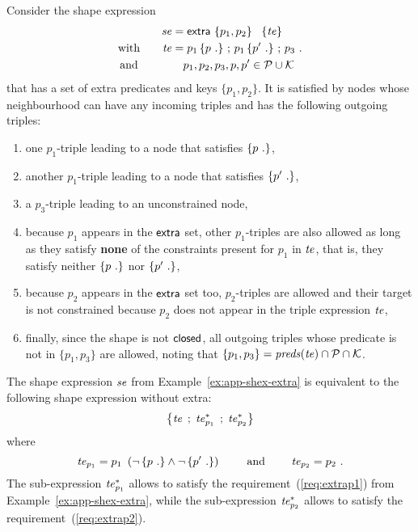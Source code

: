 \begin{example}
\label{ex:app-shex-extra}
Consider the \stshex shape expression
\begin{align*}
  \stse
& =
  \stextra\ \{p_1, p_2\}\ \ \shexneigh{\stte}
\\
  \text{with} \qquad \stte
& =
  p_1 \shexneigh{p\ .} \,\shexeach\, p_1 \shexneigh{p'\ .} \,\shexeach\, p_3\ .
\\ %
  \text{and}\qquad \quad
&
  \quad p_1, p_2, p_3, p, p' \in \Predicates \cup \Keys
\end{align*}
that has a set of extra predicates and keys $\{ p_1, p_2 \}$.
It is satisfied by nodes whose neighbourhood can have any incoming triples and
has the following outgoing triples:
\begin{enumerate}
\item
  one $p_1$-triple leading to a node that satisfies $\left\{ p\ . \right\}$,
\item
  another $p_1$-triple leading to a node that satisfies $\left\{ p'\ . \right\}$,
\item
  a $p_3$-triple leading to an unconstrained node,
\item
  \label{req:extrap1}
  because $p_1$ appears in the $\mathsf{extra}$ set, other $p_1$-triples are also
  allowed as long as they satisfy \textbf{none} of the constraints present for
  $p_1$ in $\mathit{te}$, that is, they satisfy neither $\left\{ p\ . \right\}$ nor
  $\left\{ p'\ . \right\}$,
\item
  \label{req:extrap2}
  because $p_2$ appears in the $\mathsf{extra}$ set too, $p_2$-triples are allowed and
  their target is not constrained because $p_2$ does not appear in the triple
  expression $\mathit{te}$,
\item
  \label{req:closed}
  finally, since the shape is not $\mathsf{closed}$, all outgoing triples whose
  predicate is not in $\{ p_1, p_3 \}$ are allowed, noting that $\{ p_1, p_3 \} =
  \mathit{preds}(\mathit{te}) \cap \mathcal{P} \cap \mathcal{K}$.
\end{enumerate}
\end{example}
The shape expression $\mathit{se}$ from Example~\ref{ex:app-shex-extra} is equivalent
to the following shape expression without extra:
\[
  \left\{  \mathit{te} \;\mathop{;}\; \mathit{te}_{p_1}^{*} \;\mathop{;}\; \mathit{te}_{p_2}^{*} \right\}
\]
where
\[
  \mathit{te}_{p_1}
=
  p_1\ \left( \neg \left\{ p\ . \right\} \land \neg \left\{ p'\ . \right\} \right)
\qquad \text{ and } \qquad
  \mathit{te}_{p_2}
=
  p_2\ .
\]
The sub-expression $\mathit{te}_{p_1}^{*}$ allows to satisfy the
requirement~(\ref{req:extrap1}) from Example~\ref{ex:app-shex-extra}, while the
sub-expression $\mathit{te}_{p_2}^{*}$ allows to satisfy the
requirement~(\ref{req:extrap2}).

